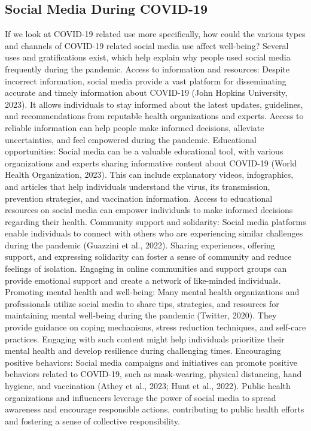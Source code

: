 \documentclass[
  man,mask,floatsintext]{apa7}
\begin{document}
\hypertarget{social-media-during-covid-19}{%
\subsection{Social Media During COVID-19}\label{social-media-during-covid-19}}

If we look at COVID-19 related use more specifically, how could the various types and channels of COVID-19 related social media use affect well-being?
Several uses and gratifications exist, which help explain why people used social media frequently during the pandemic.
Access to information and resources:
Despite incorrect information, social media provide a vast platform for disseminating accurate and timely information about COVID-19 (John Hopkins University, 2023).
It allows individuals to stay informed about the latest updates, guidelines, and recommendations from reputable health organizations and experts.
Access to reliable information can help people make informed decisions, alleviate uncertainties, and feel empowered during the pandemic.
Educational opportunities:
Social media can be a valuable educational tool, with various organizations and experts sharing informative content about COVID-19 (World Health Organization, 2023).
This can include explanatory videos, infographics, and articles that help individuals understand the virus, its transmission, prevention strategies, and vaccination information.
Access to educational resources on social media can empower individuals to make informed decisions regarding their health.
Community support and solidarity:
Social media platforms enable individuals to connect with others who are experiencing similar challenges during the pandemic (Guazzini et al., 2022).
Sharing experiences, offering support, and expressing solidarity can foster a sense of community and reduce feelings of isolation.
Engaging in online communities and support groups can provide emotional support and create a network of like-minded individuals.
Promoting mental health and well-being:
Many mental health organizations and professionals utilize social media to share tips, strategies, and resources for maintaining mental well-being during the pandemic (Twitter, 2020).
They provide guidance on coping mechanisms, stress reduction techniques, and self-care practices.
Engaging with such content might help individuals prioritize their mental health and develop resilience during challenging times.
Encouraging positive behaviors:
Social media campaigns and initiatives can promote positive behaviors related to COVID-19, such as mask-wearing, physical distancing, hand hygiene, and vaccination (Athey et al., 2023; Hunt et al., 2022).
Public health organizations and influencers leverage the power of social media to spread awareness and encourage responsible actions, contributing to public health efforts and fostering a sense of collective responsibility.
\end{document}
